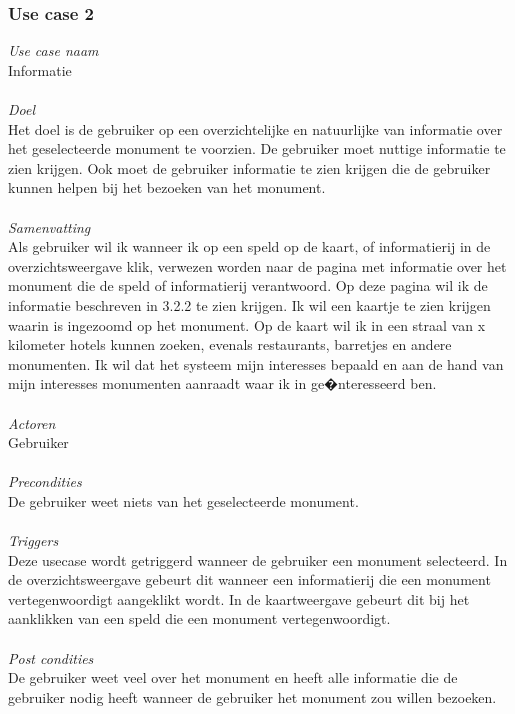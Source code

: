 \documentclass[a4paper,10pt]{article}
\begin{document}
			\subsubsection{Use case 2}
			\textit{Use case naam}\\
			Informatie\\ \\
			\textit{Doel}\\
			Het doel is de gebruiker op een overzichtelijke en natuurlijke van informatie over het geselecteerde monument te voorzien. De gebruiker moet nuttige informatie te zien krijgen. Ook moet de gebruiker informatie te zien krijgen die de gebruiker kunnen helpen bij het bezoeken van het monument.\\ \\
			\textit{Samenvatting}\\
			Als gebruiker wil ik wanneer ik op een speld op de kaart, of informatierij in de overzichtsweergave klik, verwezen worden naar de pagina met informatie over het monument die de speld of informatierij verantwoord. Op deze pagina wil ik de informatie beschreven in 3.2.2 te zien krijgen. Ik wil een kaartje te zien krijgen waarin is ingezoomd op het monument. Op de kaart wil ik in een straal van x kilometer hotels kunnen zoeken, evenals restaurants, barretjes en andere monumenten. Ik wil dat het systeem mijn interesses bepaald en aan de hand van mijn interesses monumenten aanraadt waar ik in ge�nteresseerd ben.\\ \\
			\textit{Actoren}\\
			Gebruiker\\ \\
			\textit{Precondities}\\
			De gebruiker weet niets van het geselecteerde monument.\\ \\
			\textit{Triggers}\\
			Deze usecase wordt getriggerd wanneer de gebruiker een monument selecteerd. In de overzichtsweergave gebeurt dit wanneer een informatierij die een monument vertegenwoordigt aangeklikt wordt. In de kaartweergave gebeurt dit bij het aanklikken van een speld die een monument vertegenwoordigt.\\ \\
			\textit{Post condities}\\
			De gebruiker weet veel over het monument en heeft alle informatie die de gebruiker nodig heeft wanneer de gebruiker het monument zou willen bezoeken.	
			
\end{document}
